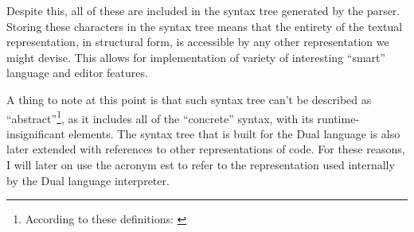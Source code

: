 Despite this, all of these are included in the syntax tree generated by the
parser. Storing these characters in the syntax tree means that the entirety of
the textual representation, in structural form, is accessible by any other
representation we might devise. This allows for implementation of variety of
interesting ``smart'' language and editor features.

A thing to note at this point is that such syntax tree can't be described as
``abstract''\footnote{According to these definitions:
  \cite{ast_wikipedia, c2_ast}}, as it includes all of the
``concrete'' syntax, with its runtime-insignificant elements. The syntax tree
that is built for the Dual language is also later extended with references to
other representations of code. For these reasons, I will later on use the
acronym \acrlong{est} to refer to the representation used internally by the Dual
language interpreter.

